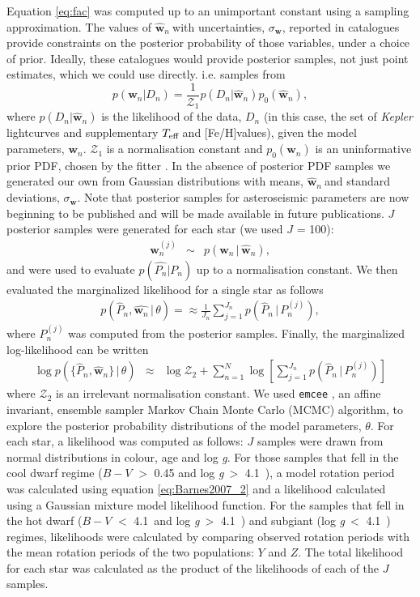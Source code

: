 \documentclass[11pt,preprint]{aastex}
\newcommand{\logg}{log \emph{g}}
\newcommand{\teff}{$T_{\rm{eff}}$}
\newcommand{\w}{\mathbf{w}}
\newcommand{\wh}{$\hat{\mathbf{w}}_n$}
\newcommand{\feh}{[Fe/H]}
\newcommand{\subcut}{4.1~}
\begin{document}
Equation \ref{eq:fac} was computed up to an unimportant constant using a sampling approximation.
The values of \wh$~$with uncertainties, $\sigma_{\mathbf{w}}$, reported in catalogues provide constraints on the posterior probability of those variables, under a choice of prior.
Ideally, these catalogues would provide posterior samples, not just point estimates, which we could use directly.
i.e. samples from
\begin{equation}
	p(\w_n|D_n) = \frac{1}{\mathcal{Z}_1}p(D_n|\hat{\w}_n)p_0(\hat{\w}_n),
\end{equation}
where $p(D_n|\hat{\w}_n)$ is the likelihood of the data, $D_n$ (in this case, the set of {\it Kepler} lightcurves and supplementary \teff$~$and \feh values), given the model parameters, $\w_n$.
$\mathcal{Z}_1$ is a normalisation constant and $p_0(\hat{\w}_n)$ is an uninformative prior PDF, chosen by the fitter \citep[][used a flat prior in age and \logg]{Chaplin2014}.
In the absence of posterior PDF samples we generated our own from Gaussian distributions with means, \wh$~$and standard deviations, $\sigma_{\mathbf{w}}$.
Note that posterior samples for asteroseismic parameters are now beginning to be published and will be made available in future publications.
$J$ posterior samples were generated for each star (we used $J$ = 100):
\begin{eqnarray}
\w_n^{(j)} &\sim& p(\w_n\,|\,\hat{\w}_n),
\end{eqnarray}
and were used to evaluate $p(\hat{P_n}|P_n)$ up to a normalisation constant.
We then evaluated the marginalized likelihood for a single star as follows
\begin{align}
	p(\hat{P}_n,\hat{\w_n}\,|\,\theta) = \approx \frac{1}{J_n} \sum_{j=1}^{J_n}p(\hat{P}_n\,|\,P_n^{(j)}),
\end{align}
where $P_n^{(j)}$ was computed from the posterior samples.
Finally, the marginalized log-likelihood can be written
\begin{eqnarray}
	\log p(\{\hat{P}_n,\hat{\w}_n\}\,|\,\theta) &\approx&
	\log \mathcal{Z}_2 + \sum_{n=1}^N
        \log \left[ \sum_{j=1}^{J_n}p(\hat{P}_n\,|\,P_n^{(j)}) \right ]
\end{eqnarray}
where $\mathcal{Z}_2$ is an irrelevant normalisation constant.
We used {\tt emcee} \citep{Foreman-Mackey2013}, an affine invariant, ensemble sampler Markov Chain Monte Carlo (MCMC) algorithm, to explore the posterior probability distributions of the model parameters, $\theta$.
For each star, a likelihood was computed as follows: $J$ samples were drawn from normal distributions in colour, age and \logg.
For those samples that fell in the cool dwarf regime ($B-V$ $>$ 0.45 and
\logg$~>$ \subcut), a model rotation period was calculated using equation
\ref{eq:Barnes2007_2} and a likelihood calculated using a Gaussian mixture model likelihood function.
For the samples that fell in the hot dwarf ($B-V$ $<$ \subcut and \logg$~>$ \subcut) and subgiant (\logg$~<$ \subcut) regimes, likelihoods were calculated by comparing observed rotation periods with the mean rotation periods of the two populations: $Y$ and $Z$.
The total likelihood for each star was calculated as the product of the likelihoods of each of the $J$ samples.
\end{document}

